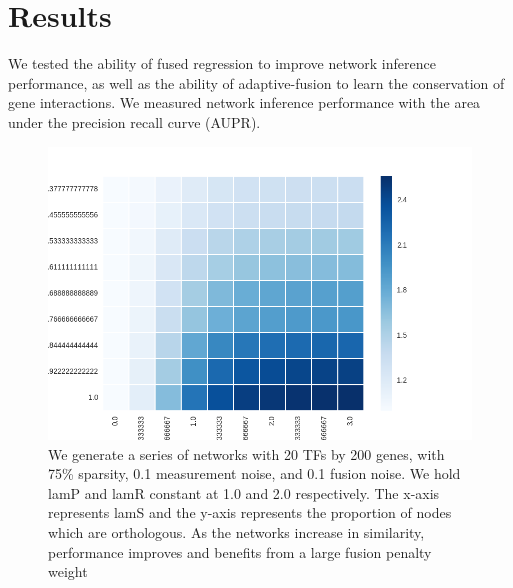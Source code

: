 \documentclass[11pt]{article}
\begin{document}
\section{Results}
We tested the ability of fused regression to improve network inference performance, as well as the ability of adaptive-fusion to learn the conservation of gene interactions. We measured network inference performance with the area under the precision recall curve (AUPR). 

\begin{figure}
\begin{center}
  \includegraphics[scale=0.45]{l2fusionquick.png}
  \caption{\label{fig:figure1} We generate a series of networks with 20 TFs by 200 genes, with 75\% sparsity, 0.1 measurement noise, and 0.1 fusion noise. We hold lamP and lamR constant at 1.0 and 2.0 respectively. The x-axis represents lamS and the y-axis represents the proportion of nodes which are orthologous. As the networks increase in similarity, performance improves and benefits from a large fusion penalty weight}
  \end{center}
\end{figure}
\end{document}
